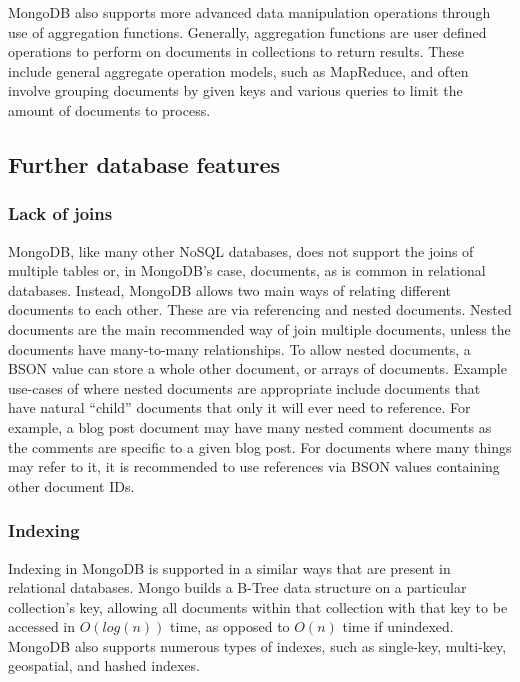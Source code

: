 \documentclass[a4paper,11pt]{article}
\begin{document}
MongoDB also supports more advanced data manipulation operations through use of aggregation functions. Generally, aggregation
functions are user defined operations to perform on documents in collections to return results. These include general
aggregate operation models, such as MapReduce, and often involve grouping documents by given keys and various queries
to limit the amount of documents to process.



\subsection{Further database features} %
\label{sub:further_database_features}

\subsubsection{Lack of joins} %
\label{ssub:joins}

MongoDB, like many other NoSQL databases, does not support the joins of multiple tables or, in MongoDB's case, documents,
as is common in relational databases.
Instead, MongoDB allows two main ways of relating different documents to each other. These are via referencing and
nested documents. Nested documents are the main recommended way of join multiple documents, unless the documents have
many-to-many relationships. To allow nested documents, a BSON value can store a whole other document, or arrays of documents.
Example use-cases of where nested documents are appropriate include documents that have natural ``child'' documents that
only it will ever need to reference. For example, a blog post document may have many nested comment documents as the
comments are specific to a given blog post. For documents where many things may refer to it, it is recommended to use
references via BSON values containing other document IDs.


\subsubsection{Indexing} %
\label{ssub:indexing}

Indexing in MongoDB is supported in a similar ways that are present in relational databases. Mongo builds a B-Tree data
structure on a particular collection's key, allowing all documents within that collection with that key to be accessed
in $O(log(n))$ time, as opposed to $O(n)$ time if unindexed. MongoDB also supports numerous types of indexes, such as
single-key, multi-key, geospatial, and hashed indexes.
\end{document}
